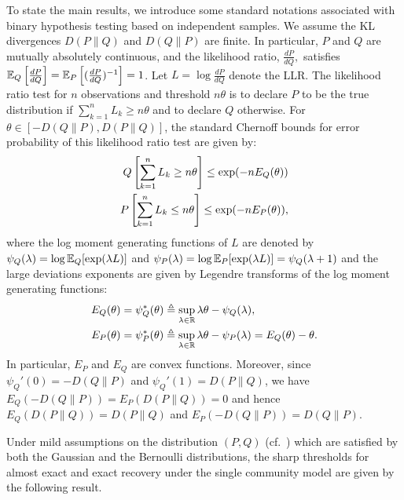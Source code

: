 To state the main results, we introduce some standard notations associated
with binary hypothesis testing based on independent samples.  We assume the KL divergences $D(P\|Q)$ and $D(Q\|P)$ are finite.  
In particular, $P$ and $Q$ are mutually absolutely continuous, and the likelihood
ratio, $\frac{dP}{dQ},$  satisfies $\mathbb{E}_Q\left[ \frac{dP}{dQ} \right] = \mathbb{E}_P\left[ (\frac{dP}{dQ})^{-1} \right] =1$.
Let $L=\log \frac{dP}{dQ}$ denote the LLR.  The likelihood ratio test for
$n$ observations and threshold $n\theta$ is to declare $P$ to be the true distribution if
$\sum_{k=1}^{n} L_k \ge n\theta$ and to declare $Q$ otherwise.  
For $\theta \in [-D(Q\|P),D(P\|Q)]$,  the standard Chernoff bounds for error probability of this likelihood ratio test are given by:
\begin{align}
Q\left[ \sum_{k=1}^{n} L_k \ge n\theta \right] \leq \exp(-n E_Q(\theta)) \label{eq:LDupper1}
  \\
P\left[ \sum_{k=1}^{n} L_k \le n\theta \right] \leq \exp(-n E_P(\theta)) \label{eq:LDupper2},
\end{align}
where the log moment generating functions of $L$ are denoted by
 $\psi_Q(\lambda) = \log \mathbb{E}_Q[\exp(\lambda L)] $ and $\psi_P(\lambda) = \log \mathbb{E}_P[\exp(\lambda L)] 
= \psi_Q(\lambda + 1 )$ and the large deviations exponents are given by Legendre transforms of the
log moment generating functions:
\begin{align}
E_Q(\theta)  & = \psi_Q^*(\theta) \triangleq \sup_{\lambda \in {\mathbb{R}}} \lambda \theta - \psi_Q(\lambda),  \label{eq:ratefunction}    \\
 E_P(\theta)  & =  \psi_P^*(\theta) \triangleq  \sup_{\lambda \in {\mathbb{R}}} \lambda \theta - \psi_P(\lambda) =E_Q(\theta) -\theta.	 \label{eq:EP}
\end{align}
In particular, $E_P$ and $E_Q$ are convex functions. Moreover, since $\psi_Q'(0)=-D(Q\|P)$ and $\psi_Q'(1)=D(P\|Q)$, we have $E_Q(-D(Q\|P)) = E_P(D(P\|Q)) = 0$ and hence 
$E_Q(D(P\|Q))=D(P\|Q)$ and $E_P(-D(Q\|P))=D(Q\|P)$. 



Under mild assumptions on the distribution $(P,Q)$ (cf.~\cite[Assumption 1]{HajekWuXu_one_info_lim15}) which are satisfied by both the Gaussian and the Bernoulli distributions, the sharp thresholds for almost exact and exact recovery under the single community model are given by the following result.


